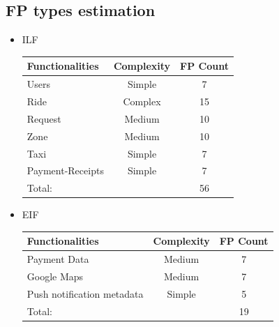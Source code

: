 \documentclass[a4paper,11pt]{report} %
\begin{document}
		\subsection{FP types estimation}
			\begin{itemize}
				\item ILF
							\renewcommand{\arraystretch}{1.2}
							\setlength{\tabcolsep}{12pt}
					\begin{center}
						\begin{tabular}{| p{7cm} | p{2.5cm} | p{2cm} |}\hline
							\textbf{Functionalities} & \multicolumn{1}{|c|}{\textbf{Complexity}} & \textbf{FP Count}\\\hline
							Users & \multicolumn{1}{|c|}{Simple} & \multicolumn{1}{|c|}{7}\\\hline
							Ride & \multicolumn{1}{|c|}{Complex} & \multicolumn{1}{|c|}{15}\\\hline
							Request & \multicolumn{1}{|c|}{Medium} & \multicolumn{1}{|c|}{10}\\\hline		
							Zone & \multicolumn{1}{|c|}{Medium} & \multicolumn{1}{|c|}{10}\\\hline	
							Taxi & \multicolumn{1}{|c|}{Simple} & \multicolumn{1}{|c|}{7}\\\hline		
							Payment-Receipts & \multicolumn{1}{|c|}{Simple} & \multicolumn{1}{|c|}{7}\\\hline																														
							\multicolumn{2}{|l|}{Total:} & \multicolumn{1}{|c|}{56}\\\hline
						\end{tabular}
					\end{center}
				\item EIF
				\renewcommand{\arraystretch}{1.2}
				\setlength{\tabcolsep}{12pt}
				\begin{center}
					\begin{tabular}{| p{7cm} | p{2.5cm} | p{2cm} |}\hline
						\textbf{Functionalities} & \multicolumn{1}{|c|}{\textbf{Complexity}} & \textbf{FP Count}\\\hline						
						Payment Data & \multicolumn{1}{|c|}{Medium} & \multicolumn{1}{|c|}{7}\\\hline
						Google Maps & \multicolumn{1}{|c|}{Medium} & \multicolumn{1}{|c|}{7}\\\hline
						Push notification metadata & \multicolumn{1}{|c|}{Simple} & \multicolumn{1}{|c|}{5}\\\hline		
						\multicolumn{2}{|l|}{Total:} & \multicolumn{1}{|c|}{19}\\\hline	

\end{tabular}
\end{center}
\end{itemize}
\end{document}
